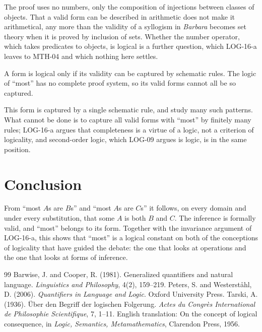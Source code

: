 \documentclass{situationist-preprint}
\begin{document}
\begin{reply}
The proof uses no numbers, only the composition of injections between classes of objects. That a valid form can be described in arithmetic does not make it arithmetical, any more than the validity of a syllogism in \emph{Barbara} becomes set theory when it is proved by inclusion of sets. Whether the number operator, which takes predicates to objects, is logical is a further question, which LOG-16-a leaves to MTH-04 and which nothing here settles.
\end{reply}

\begin{objection}[No rules]
A form is logical only if its validity can be captured by schematic rules. The logic of \enquote{most} has no complete proof system, so its valid forms cannot all be so captured.
\end{objection}

\begin{reply}
This form is captured by a single schematic rule, and \citet{PetersWesterstahl2006} study many such patterns. What cannot be done is to capture all valid forms with \enquote{most} by finitely many rules; LOG-16-a argues that completeness is a virtue of a logic, not a criterion of logicality, and second-order logic, which LOG-09 argues is logic, is in the same position.
\end{reply}

\section{Conclusion}

From \enquote{most $A$s are $B$s} and \enquote{most $A$s are $C$s} it follows, on every domain and under every substitution, that some $A$ is both $B$ and $C$. The inference is formally valid, and \enquote{most} belongs to its form. Together with the invariance argument of LOG-16-a, this shows that \enquote{most} is a logical constant on both of the conceptions of logicality that have guided the debate: the one that looks at operations and the one that looks at forms of inference.

\begin{thebibliography}{99}\small
{} Barwise, J. and Cooper, R. (1981). Generalized quantifiers and natural language. \emph{Linguistics and Philosophy}, 4(2), 159--219.
 Peters, S. and Westerst{\aa}hl, D. (2006). \emph{Quantifiers in Language and Logic}. Oxford University Press.
 Tarski, A. (1936). \"Uber den Begriff der logischen Folgerung. \emph{Actes du Congr\`es International de Philosophie Scientifique}, 7, 1--11. English translation: On the concept of logical consequence, in \emph{Logic, Semantics, Metamathematics}, Clarendon Press, 1956.
\end{thebibliography}
\end{document}
